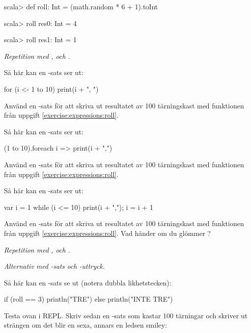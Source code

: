 \SubtaskSolved 
\begin{REPL}
scala> def roll: Int = (math.random * 6 + 1).toInt

scala> roll
res0: Int = 4

scala> roll
res1: Int = 1
\end{REPL}

\QUESTEND




\def\what{\emph{Repetition med \code{for},  och .}}

\QUESTBEGIN

\Task \what

\Subtask Så här kan en -sats ser ut: 
\begin{Code}
for (i <- 1 to 10) print(i + ", ")
\end{Code}
Använd en -sats för att skriva ut resultatet av 100 tärningskast med funktionen  från uppgift \ref{exercise:expressions:roll}. 

\Subtask Så här kan en -sats ser ut: 
\begin{Code}
(1 to 10).foreach { i => print(i + ",") }
\end{Code}
Använd en -sats för att skriva ut resultatet av 100 tärningskast med funktionen  från uppgift \ref{exercise:expressions:roll}. 

\Subtask Så här kan en -sats ser ut: 
\begin{Code}
var i = 1
while (i <= 10) { print(i + ","); i = i + 1 }
\end{Code}
Använd en -sats för att skriva ut resultatet av 100 tärningskast med funktionen  från uppgift \ref{exercise:expressions:roll}. Vad händer om du glömmer  ?


\SOLUTION

\TaskSolved \what

\SubtaskSolved \TODO

\QUESTEND


\def\what{\emph{Alternativ med \code{if}-sats och -uttryck.}}

\QUESTBEGIN

\Task \what

\Subtask Så här kan en -sats se ut (notera dubbla likhetstecken):
\begin{Code}
if (roll == 3) println("TRE") else println("INTE TRE") 
\end{Code}
Testa ovan i REPL. Skriv sedan en -sats som kastar 100 tärningar och skriver ut strängen  om det blir en sexa, annars en ledsen smiley:  

